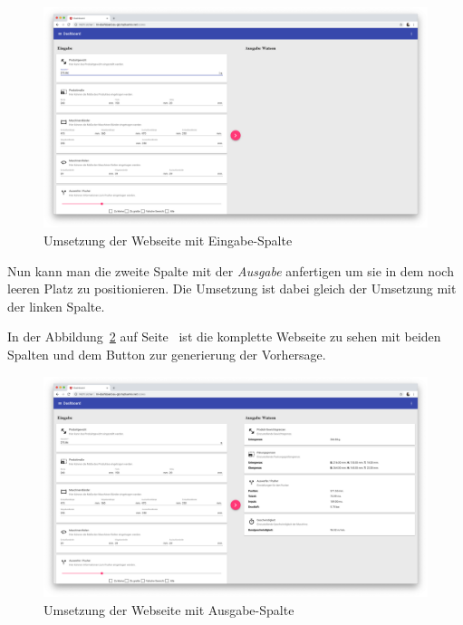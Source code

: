 \begin{figure}[h]
    \centering
    \includegraphics[width=\textwidth]{images/kapitel_4/website_input.png}
    \caption{Umsetzung der Webseite mit Eingabe-Spalte}
    \label{fig:umsetzung_website_input}
\end{figure}

Nun kann man die zweite Spalte mit der \textit{Ausgabe} anfertigen um sie in dem noch leeren Platz zu positionieren. Die
Umsetzung ist dabei gleich der Umsetzung mit der linken Spalte.

In der Abbildung~\ref{fig:umsetzung_website_output} auf Seite~\pageref{fig:umsetzung_website_output} ist die komplette
Webseite zu sehen mit beiden Spalten und dem Button zur generierung der Vorhersage.

\begin{figure}[h]
    \centering
    \includegraphics[width=\textwidth]{images/kapitel_4/website_output.png}
    \caption{Umsetzung der Webseite mit Ausgabe-Spalte}
    \label{fig:umsetzung_website_output}
\end{figure}

